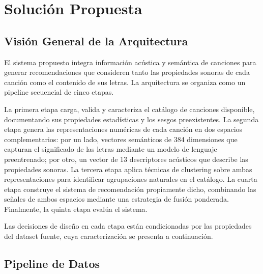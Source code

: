 \chapter{Solución Propuesta}
\label{ch:solucion-propuesta}


\section{Visión General de la Arquitectura}
\label{sec:vision-general}

El sistema propuesto integra información acústica y semántica de canciones para generar recomendaciones que consideren tanto las propiedades sonoras de cada canción como el contenido de sus letras. La arquitectura se organiza como un pipeline secuencial de cinco etapas.

La primera etapa carga, valida y caracteriza el catálogo de canciones disponible, documentando sus propiedades estadísticas y los sesgos preexistentes. La segunda etapa genera las representaciones numéricas de cada canción en dos espacios complementarios: por un lado, vectores semánticos de 384 dimensiones que capturan el significado de las letras mediante un modelo de lenguaje preentrenado; por otro, un vector de 13 descriptores acústicos que describe las propiedades sonoras. La tercera etapa aplica técnicas de clustering sobre ambas representaciones para identificar agrupaciones naturales en el catálogo. La cuarta etapa construye el sistema de recomendación propiamente dicho, combinando las señales de ambos espacios mediante una estrategia de fusión ponderada. Finalmente, la quinta etapa evalúa el sistema.

Las decisiones de diseño en cada etapa están condicionadas por las propiedades del dataset fuente, cuya caracterización se presenta a continuación.

\section{Pipeline de Datos}
\label{sec:pipeline-datos}

